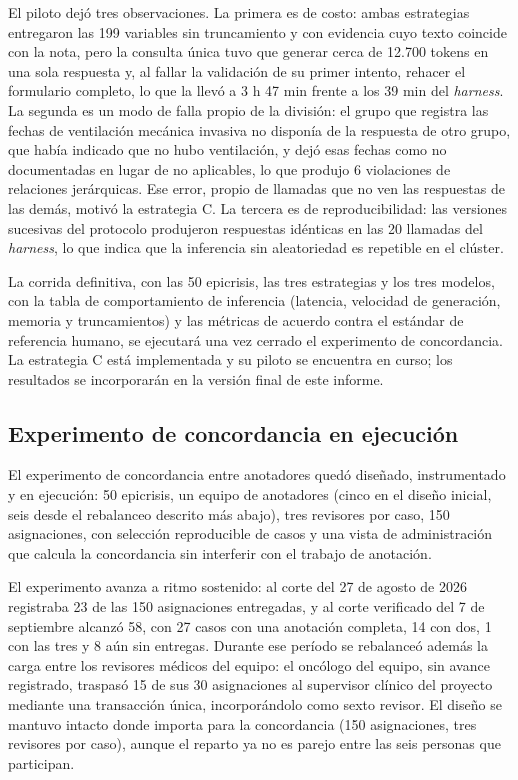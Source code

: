 \documentclass[12pt,letterpaper]{article}
\begin{document}
El piloto dejó tres observaciones. La primera es de costo: ambas estrategias entregaron las 199 variables sin truncamiento y con evidencia cuyo texto coincide con la nota, pero la consulta única tuvo que generar cerca de 12.700 tokens en una sola respuesta y, al fallar la validación de su primer intento, rehacer el formulario completo, lo que la llevó a 3 h 47 min frente a los 39 min del \textit{harness}. La segunda es un modo de falla propio de la división: el grupo que registra las fechas de ventilación mecánica invasiva no disponía de la respuesta de otro grupo, que había indicado que no hubo ventilación, y dejó esas fechas como no documentadas en lugar de no aplicables, lo que produjo 6 violaciones de relaciones jerárquicas. Ese error, propio de llamadas que no ven las respuestas de las demás, motivó la estrategia C. La tercera es de reproducibilidad: las versiones sucesivas del protocolo produjeron respuestas idénticas en las 20 llamadas del \textit{harness}, lo que indica que la inferencia sin aleatoriedad es repetible en el clúster.

La corrida definitiva, con las 50 epicrisis, las tres estrategias y los tres modelos, con la tabla de comportamiento de inferencia (latencia, velocidad de generación, memoria y truncamientos) y las métricas de acuerdo contra el estándar de referencia humano, se ejecutará una vez cerrado el experimento de concordancia. La estrategia C está implementada y su piloto se encuentra en curso; los resultados se incorporarán en la versión final de este informe.

\subsection{Experimento de concordancia en ejecución}\label{sec:concordancia}

El experimento de concordancia entre anotadores quedó diseñado, instrumentado y en ejecución: 50 epicrisis, un equipo de anotadores (cinco en el diseño inicial, seis desde el rebalanceo descrito más abajo), tres revisores por caso, 150 asignaciones, con selección reproducible de casos y una vista de administración que calcula la concordancia sin interferir con el trabajo de anotación.

El experimento avanza a ritmo sostenido: al corte del 27 de agosto de 2026 registraba 23 de las 150 asignaciones entregadas, y al corte verificado del 7 de septiembre alcanzó 58, con 27 casos con una anotación completa, 14 con dos, 1 con las tres y 8 aún sin entregas. Durante ese período se rebalanceó además la carga entre los revisores médicos del equipo: el oncólogo del equipo, sin avance registrado, traspasó 15 de sus 30 asignaciones al supervisor clínico del proyecto mediante una transacción única, incorporándolo como sexto revisor. El diseño se mantuvo intacto donde importa para la concordancia (150 asignaciones, tres revisores por caso), aunque el reparto ya no es parejo entre las seis personas que participan.
\end{document}
